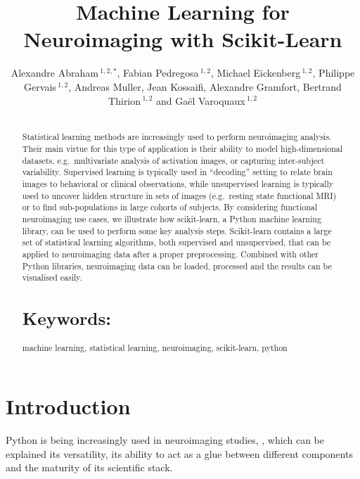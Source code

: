 \documentclass{frontiersSCNS} %
\def\firstAuthorLast{Alexandre Abraham {et~al}} %
\def\Authors{
    Alexandre Abraham\,$^{1,2,*}$,
    Fabian Pedregosa\,$^{1,2}$,
    Michael Eickenberg\,$^{1,2}$,
    Philippe Gervais\,$^{1,2}$,
    Andreas Muller,
    Jean Kossaifi,
    Alexandre Gramfort,
    Bertrand Thirion\,$^{1,2}$
    and Ga\"el Varoquaux\,$^{1,2}$}
\begin{document}
\onecolumn
{}

\title[Machine Learning for Neuroimaging with Scikit-Learn]{Machine Learning for Neuroimaging with Scikit-Learn}
\author[\firstAuthorLast ]{\Authors}
\address{}
\correspondance{}
\editor{}

\maketitle
\begin{abstract}

\section{}
Statistical learning methods are increasingly used to perform
neuroimaging analysis. Their main virtue for this type of application
is their ability to model high-dimensional datasets, e.g.\ multivariate
analysis of activation images, or capturing inter-subject variability.
Supervised learning is typically used in “decoding” setting to relate
brain images to behavioral or clinical observations, while
unsupervised learning is typically used to uncover hidden structure in
sets of images (e.g.\ resting state functional MRI) or to find
sub-populations in large cohorts of subjects. By considering
functional neuroimaging use cases, we illustrate how scikit-learn,
a Python machine learning library, can be used to perform some key
analysis steps. Scikit-learn contains a large set of statistical
learning algorithms, both supervised and unsupervised, that can be applied
to neuroimaging data after a proper preprocessing. Combined with other
Python libraries, neuroimaging data can be loaded, processed and the results
can be visualised easily.



\tiny
\section{Keywords:} machine learning, statistical learning, neuroimaging, scikit-learn, python
\end{abstract}


\section{Introduction}

Python is being increasingly used in neuroimaging studies, \cite{millman2007analysis, hanke2009pymvpa}, which can be explained its
versatility, its ability to act as a glue between different components and the
maturity of its scientific stack.
\end{document}
